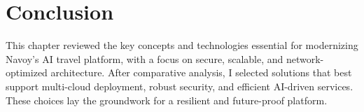\setcounter{secnumdepth}{0} %
\section{Conclusion}
This chapter reviewed the key concepts and technologies essential for modernizing Navoy's AI travel platform, with a focus on secure, scalable, and network-optimized architecture. After comparative analysis, I selected solutions that best support multi-cloud deployment, robust security, and efficient AI-driven services. These choices lay the groundwork for a resilient and future-proof platform.
